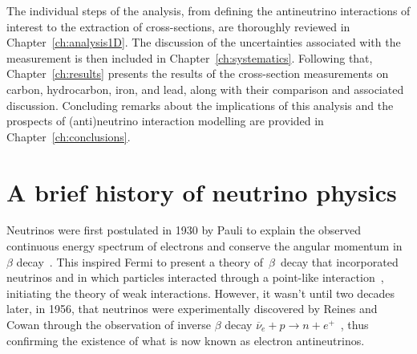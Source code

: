 The individual steps of the analysis, from defining the antineutrino interactions of interest to the extraction of cross-sections, are thoroughly reviewed in Chapter~\ref{ch:analysis1D}. The discussion of the uncertainties associated with the measurement is then included in Chapter~\ref{ch:systematics}. Following that, Chapter~\ref{ch:results} presents the results of the cross-section measurements on carbon, hydrocarbon, iron, and lead, along with their comparison and associated discussion. Concluding remarks about the implications of this analysis and the prospects of (anti)neutrino interaction modelling are provided in Chapter~\ref{ch:conclusions}.

\section{A brief history of neutrino physics}

Neutrinos were first postulated in 1930 by Pauli to explain the observed continuous energy spectrum of electrons and conserve the angular momentum in $\beta$ decay~\cite{Pauli}. This inspired Fermi to present a theory of~$\beta$~decay that incorporated neutrinos and in which particles interacted through a point-like interaction~\cite{Fermi}, initiating the theory of weak interactions. 
However, it wasn't until two decades later, in 1956, that neutrinos were experimentally discovered by Reines and Cowan through the observation of inverse $\beta$ decay $\overline{\nu}_e + p \rightarrow n + e^+$~\cite{Cowan103}, thus confirming the existence of what is now known as electron antineutrinos. 

